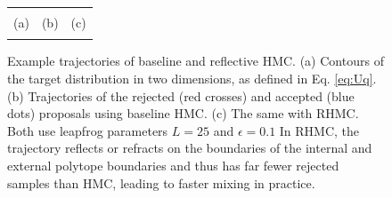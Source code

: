 \documentclass{article} %
\begin{document}
\begin{figure}[t!]
\begin{center}
\begin{tabular}{ccc}
\vspace{-3.5mm}
\\
   \footnotesize(a) 
& \footnotesize(b) 
& \footnotesize(c) 
\\
\multicolumn{2}{c}{}
\end{tabular}
\end{center}
\vspace{-8mm}
\caption{\footnotesize
Example trajectories of baseline and reflective HMC. (a) Contours of the target distribution in two dimensions, as defined in Eq. \ref{eq:Uq}. (b) Trajectories of the rejected (red crosses) and accepted (blue dots) proposals using baseline HMC. (c) The same with RHMC. Both use leapfrog parameters $L=25$ and $\epsilon=0.1$ In RHMC, the trajectory reflects or refracts on the boundaries of the internal and external polytope boundaries and thus has far fewer rejected samples than HMC, leading to faster mixing in practice.} 
\label{fig:mom}
\vspace{-10pt}
\end{figure}
\end{document}

